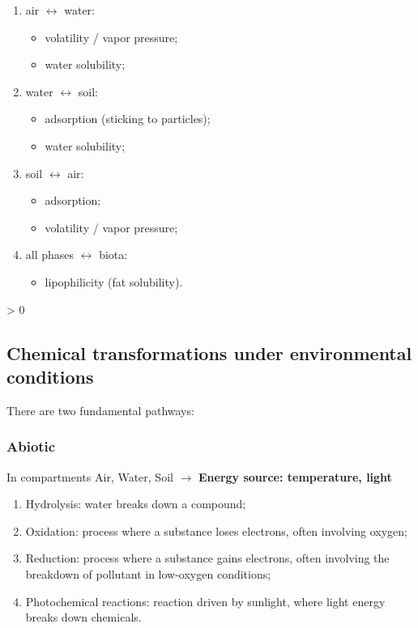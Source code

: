 \documentclass{article}
\makeatletter
\newcommand{\wrapfill}{
    \par
    \ifnum \value{WF@wrappedlines} > 0
        \addtocounter{WF@wrappedlines}{-1}%
        \null\vspace{
            \arabic{WF@wrappedlines}
            \baselineskip
        }
        \WFclear
    \fi
    \phantom{}
}
\makeatother
\begin{document}
\begin{enumerate}
    \item air $\longleftrightarrow$ water:
        \begin{itemize}
            \item volatility / vapor pressure;
            \item water solubility;
        \end{itemize}
    \item water $\longleftrightarrow$ soil:
        \begin{itemize}
            \item adsorption (sticking to particles);
            \item water solubility;
        \end{itemize}
    \item soil $\longleftrightarrow$ air:
        \begin{itemize}
            \item adsorption;
            \item volatility / vapor pressure;
        \end{itemize}
    \item all phases $\longleftrightarrow$ biota:
        \begin{itemize}
            \item lipophilicity (fat solubility).
        \end{itemize}
\end{enumerate}
\wrapfill
\vspace*{-3cm}

\subsection{Chemical transformations under environmental conditions}
There are two fundamental pathways:

\subsubsection{Abiotic}
In compartments Air, Water, Soil $\rightarrow$ \textbf{Energy source: temperature, light}
\begin{enumerate}
    \item Hydrolysis: water breaks down a compound;
    \item Oxidation: process where a substance loses electrons, often involving oxygen;
    \item Reduction: process where a substance gains electrons, often involving the breakdown of pollutant in low-oxygen conditions;
    \item Photochemical reactions: reaction driven by sunlight, where light energy breaks down chemicals.
\end{enumerate}
\end{document}
